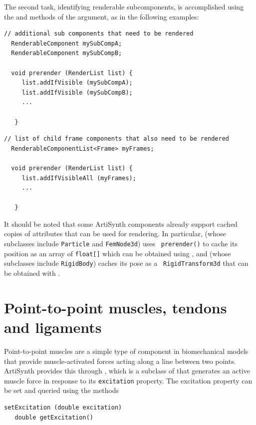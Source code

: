 The second task, identifying renderable subcomponents,
is accomplished using the
and 
methods of the
 argument, as
in the following examples:
%
\begin{lstlisting}[]
  // additional sub components that need to be rendered
  RenderableComponent mySubCompA;
  RenderableComponent mySubCompB;
 
  void prerender (RenderList list) {
     list.addIfVisible (mySubCompA);
     list.addIfVisible (mySubCompB);
     ...

   }
\end{lstlisting}
%
\begin{lstlisting}[]
  // list of child frame components that also need to be rendered
  RenderableComponentList<Frame> myFrames;

  void prerender (RenderList list) {
     list.addIfVisibleAll (myFrames);
     ...

   }
\end{lstlisting}
%

It should be noted that some ArtiSynth components already support
cached copies of attributes that can be used for rendering.
In particular,
 (whose
subclasses include {\tt Particle} and {\tt FemNode3d}) uses {\tt
prerender()} to cache its position as an array of {\tt float[]}
which can be obtained using
,
and 
 (whose
subclasses include {\tt RigidBody}) caches its pose as a {\tt
RigidTransform3d} that can be obtained with
.

\section{Point-to-point muscles, tendons and ligaments}
\label{PointToPointMuscles:sec}

Point-to-point muscles are a simple type of component in biomechanical
models that provide muscle-activated forces acting along a line
between two points. ArtiSynth provides this through
, which is a subclass of
 that generates an
active muscle force in response to its {\tt excitation} property. The
excitation property can be set and queried using the methods
\begin{lstlisting}[]
   setExcitation (double excitation)
   double getExcitation()
\end{lstlisting}
%

